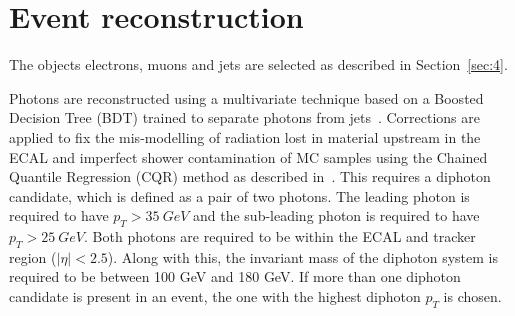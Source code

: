 \section{Event reconstruction}
\label{sec:Objects}

The objects electrons, muons and jets are selected as described in Section~\ref{sec:4}.



Photons are reconstructed using a multivariate technique based on a Boosted Decision Tree (BDT) trained to separate photons from jets~\cite{Sirunyan:2018ouh}.
Corrections are applied to fix the mis-modelling of radiation lost in material upstream in the ECAL
and imperfect shower contamination of MC samples using the Chained Quantile Regression (CQR) method as described in~\cite{Khachatryan:2014ira}.
This requires a diphoton candidate, which is defined as a pair of two photons.
The leading photon is required to have $p_T > 35 ~GeV$ and the sub-leading photon is required to have $p_T > 25 ~GeV$.
Both photons are required to be within the ECAL and tracker region ($|\eta| < 2.5$). Along with this,
the invariant mass of the diphoton system is required to be between 100 GeV and 180 GeV.
If more than one diphoton candidate is present in an event, the one with the highest diphoton $p_T$ is chosen.

 
